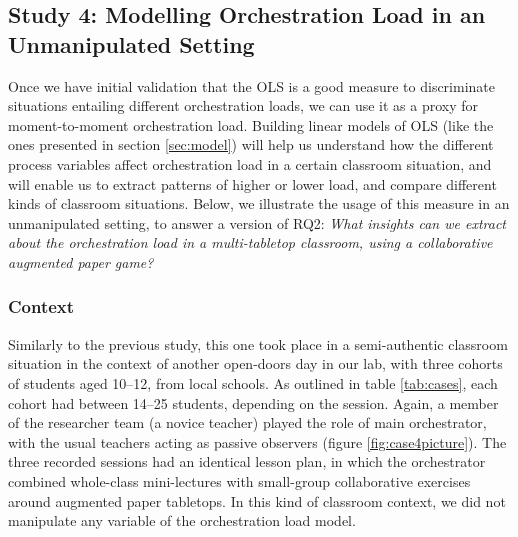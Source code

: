 \documentclass[10pt,journal,compsoc]{IEEEtran}
\begin{document}
\subsection{Study 4: Modelling Orchestration Load in an Unmanipulated Setting}
\label{sec:study4}

Once we have initial validation that the OLS is a good measure to discriminate situations entailing different orchestration loads, we can use it as a proxy for moment-to-moment orchestration load. Building linear models of OLS (like the ones presented in section \ref{sec:model}) will help us understand how the different process variables affect orchestration load in a certain classroom situation, and will enable us to extract patterns of higher or lower load, and compare different kinds of classroom situations. Below, we illustrate the usage of this measure in an unmanipulated setting, to answer a version of RQ2: \textit{What insights can we extract about the orchestration load in a multi-tabletop classroom, using a collaborative augmented paper game?}


\subsubsection{Context}

Similarly to the previous study, this one took place in a semi-authentic classroom situation in the context of another open-doors day in our lab, with three cohorts of students aged 10--12, from local schools. As outlined in table \ref{tab:cases}, each cohort had between 14--25 students, depending on the session. Again, a member of the researcher team (a novice teacher) played the role of main orchestrator, with the usual teachers acting as passive observers (figure \ref{fig:case4picture}). The three recorded sessions had an identical lesson plan, in which the orchestrator combined whole-class mini-lectures with small-group collaborative exercises around augmented paper tabletops. %
In this kind of classroom context, we did not manipulate any variable of the orchestration load model. %
\end{document}
